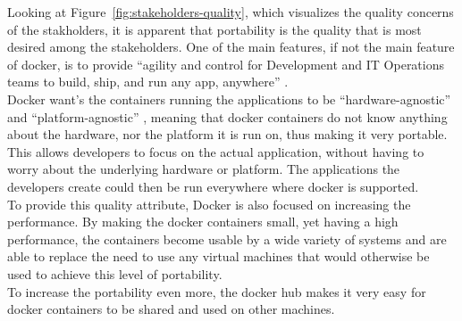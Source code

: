 Looking at Figure~\ref{fig:stakeholders-quality}, which visualizes the quality concerns of the stakholders, it is apparent that portability is the quality that is most desired among the stakeholders. One of the main features, if not the main feature of docker, is to provide ``agility and control for Development and IT Operations teams to build, ship, and run any app, anywhere'' \cite{dockermain}.\\
Docker want's the containers running the applications to be ``hardware-agnostic'' and ``platform-agnostic'' \cite{dockerrepo}, meaning that docker containers do not know anything about the hardware, nor the platform it is run on, thus making it very portable. This allows developers to focus on the actual application, without having to worry about the underlying hardware or platform. The applications the developers create could then be run everywhere where docker is supported.\\
To provide this quality attribute, Docker is also focused on increasing the performance. By making the docker containers small, yet having a high performance, the containers become usable by a wide variety of systems and are able to replace the need to use any virtual machines that would otherwise be used to achieve this level of portability. \cite{dockerrepo}\\
To increase the portability even more, the docker hub makes it very easy for docker containers to be shared and used on other machines.


